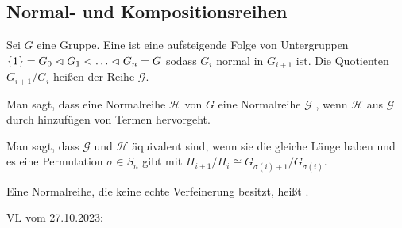 \documentclass[../main.tex]{subfiles}
\begin{document}
\subsection{Normal- und Kompositionsreihen}

\begin{definition}
Sei $G$ eine Gruppe. Eine  ist eine aufsteigende Folge von Untergruppen $\trivGO=G_0\nt G_1\nt \dots \nt G_n = G$ sodass $G_i$ normal in $G_{i+1}$ ist. Die Quotienten $G_{i+1}/G_i$ heißen  der Reihe $\mathcal{G}$.

Man sagt, dass eine Normalreihe $\mathcal{H}$ von $G$ eine Normalreihe $\mathcal{G}$ , wenn $\mathcal{H}$ aus $\mathcal{G}$ durch hinzufügen von Termen hervorgeht.

Man sagt, dass $\mathcal{G}$ und $\mathcal{H}$ äquivalent sind, wenn sie die gleiche Länge haben und es eine Permutation $\sigma \in S_n$ gibt mit $H_{i+1}/H_i \cong G_{\sigma(i)+1}/G_{\sigma(i)}$.

Eine Normalreihe, die keine echte Verfeinerung besitzt, heißt .
\end{definition}

\begin{flushright}
VL vom 27.10.2023:
\end{flushright}
\end{document}
